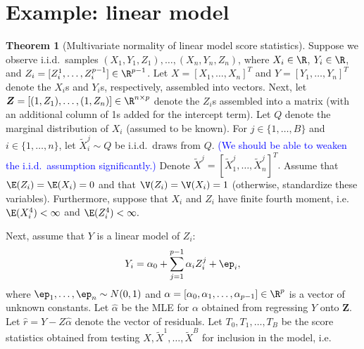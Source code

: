 \documentclass[12pt]{article}
\newcommand{\bs}[1]{\boldsymbol{#1}}
\begin{document}
\section{Example: linear model}

\textbf{Theorem 1} (Multivariate normality of linear model score statistics). Suppose we observe i.i.d.\ samples $(X_1,Y_1, Z_1), \dots, (X_n, Y_n, Z_n)$, where $X_i \in \R$, $Y_i \in \R$, and $Z_i = [Z_i^1, \dots, Z_i^{p-1}] \in \R^{p-1}$. Let $X = [X_1, \dots, X_n]^T$ and $Y = [Y_1, \dots, Y_n]^T$ denote the $X_i$s and $Y_i$s, respectively, assembled into vectors. Next, let $\bs{Z} = [(1, Z_1), \dots, (1, Z_n)] \in \R^{n \times p}$ denote the $Z_i$s assembled into a matrix (with an additional column of 1s added for the intercept term). Let $Q$ denote the marginal distribution of $X_i$ (assumed to be known). For $j \in \{1, \dots, B\}$ and $i \in \{1, \dots, n\}$, let $\tilde{X}^j_i \sim Q$ be i.i.d.\ draws from $Q$. \textcolor{blue}{(We should be able to weaken the i.i.d.\ assumption significantly.)} Denote $\tilde{X}^j = [\tilde{X}^j_1, \dots, \tilde{X}^j_n]^T.$ Assume that $\E(Z_i) = \E(X_i) = 0$ and that $\V(Z_i) = \V(X_i) = 1$ (otherwise, standardize these variables). Furthermore, suppose that $X_i$ and $Z_i$ have finite fourth moment, i.e.\ $\E(X_i^4) < \infty$ and $\E(Z_i^4) < \infty.$

Next, assume that $Y$ is a linear model of $Z_i$:
$$
Y_i = \alpha_0 + \sum_{j=1}^{p-1} \alpha_i Z_i^j + \ep_i,
$$
where $\ep_1, \dots, \ep_n \sim N(0,1)$ and $\alpha = [\alpha_0, \alpha_1, \dots, \alpha_{p-1}] \in \R^{p}$ is a vector of unknown constants. Let $\hat{\alpha}$ be the MLE for $\alpha$ obtained from regressing $Y$ onto $\bs{Z}$. Let $\hat{r} = Y - Z\hat{\alpha}$ denote the vector of residuals. Let $T_0, T_1, \dots, T_B$ be the score statistics obtained from testing $X, \tilde{X}^1, \dots, \tilde{X}^B$ for inclusion in the model, i.e.
\end{document}

